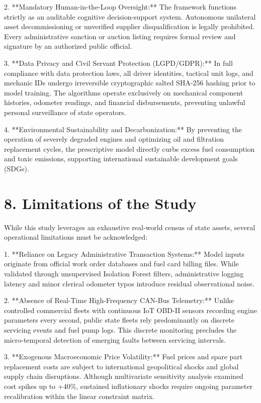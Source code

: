 \documentclass[10pt,a4paper,journal]{article}
\begin{document}
2. **Mandatory Human-in-the-Loop Oversight:** The framework functions strictly as an auditable cognitive decision-support system. Autonomous unilateral asset decommissioning or unverified supplier disqualification is legally prohibited. Every administrative sanction or auction listing requires formal review and signature by an authorized public official.

3. **Data Privacy and Civil Servant Protection (LGPD/GDPR):** In full compliance with data protection laws, all driver identities, tactical unit logs, and mechanic IDs undergo irreversible cryptographic salted SHA-256 hashing prior to model training. The algorithms operate exclusively on mechanical component histories, odometer readings, and financial disbursements, preventing unlawful personal surveillance of state operators.

4. **Environmental Sustainability and Decarbonization:** By preventing the operation of severely degraded engines and optimizing oil and filtration replacement cycles, the prescriptive model directly curbs excess fuel consumption and toxic emissions, supporting international sustainable development goals (SDGs).

\section{8. Limitations of the Study}
While this study leverages an exhaustive real-world census of state assets, several operational limitations must be acknowledged:

1. **Reliance on Legacy Administrative Transaction Systems:** Model inputs originate from official work order databases and fuel card billing files. While validated through unsupervised Isolation Forest filters, administrative logging latency and minor clerical odometer typos introduce residual observational noise.

2. **Absence of Real-Time High-Frequency CAN-Bus Telemetry:** Unlike controlled commercial fleets with continuous IoT OBD-II sensors recording engine parameters every second, public state fleets rely predominantly on discrete servicing events and fuel pump logs. This discrete monitoring precludes the micro-temporal detection of emerging faults between servicing intervals.

3. **Exogenous Macroeconomic Price Volatility:** Fuel prices and spare part replacement costs are subject to international geopolitical shocks and global supply chain disruptions. Although multivariate sensitivity analysis examined cost spikes up to +40\%, sustained inflationary shocks require ongoing parameter recalibration within the linear constraint matrix.
\end{document}
